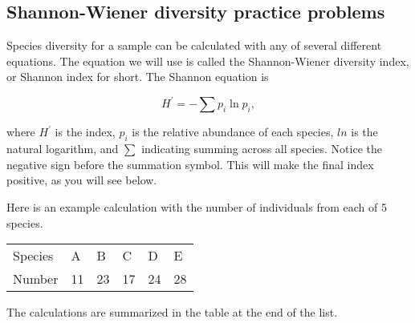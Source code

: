 \documentclass[12pt]{exam}
\begin{document}
\subsection*{Shannon-Wiener diversity practice problems}


%

Species diversity for a sample can be calculated with any of several different equations. The equation we will use is called the Shannon-Wiener diversity index, or Shannon index for short. The Shannon equation is

\[H^{\prime} = -\sum p_i \ln p_i,\] 

where $H^{\prime}$ is the index, $p_i$ is the relative abundance of each species, $ln$ is the natural logarithm, and $\sum$ indicating summing across all species. Notice the negative sign before the summation symbol. This will make the final index positive, as you will see below.

Here is an example calculation with the number of individuals from each of 5 species.

\begin{tabular}{llllll}
Species & A & B & C & D & E \tabularnewline
Number & 11 & 23 & 17 & 24 & 28 \tabularnewline
\end{tabular}

The calculations are summarized in the table at the end of the list.
\end{document}
